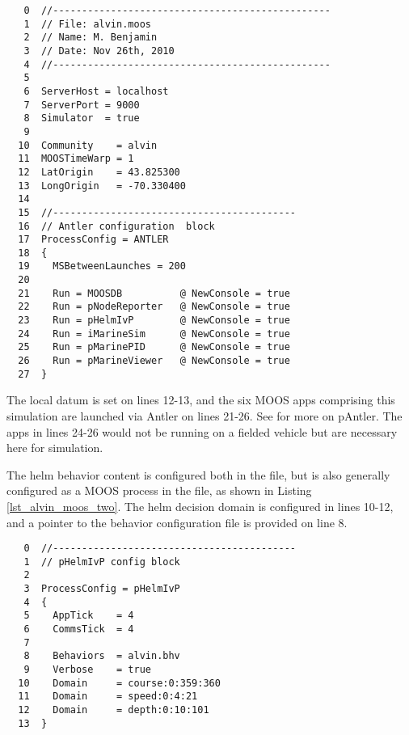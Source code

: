 \vspace{0.1in}
\vspace{0.1in}
\label{lst_alvin_moos_one}
\scriptsize
\begin{verbatim}
   0  //------------------------------------------------
   1  // File: alvin.moos
   2  // Name: M. Benjamin
   3  // Date: Nov 26th, 2010
   4  //------------------------------------------------
   5  
   6  ServerHost = localhost
   7  ServerPort = 9000
   8  Simulator  = true
   9  
  10  Community    = alvin
  11  MOOSTimeWarp = 1
  12  LatOrigin    = 43.825300 
  13  LongOrigin   = -70.330400 
  14  
  15  //------------------------------------------
  16  // Antler configuration  block
  17  ProcessConfig = ANTLER
  18  {
  19    MSBetweenLaunches = 200
  20  
  21    Run = MOOSDB          @ NewConsole = true
  22    Run = pNodeReporter   @ NewConsole = true
  23    Run = pHelmIvP        @ NewConsole = true
  24    Run = iMarineSim      @ NewConsole = true
  25    Run = pMarinePID      @ NewConsole = true
  26    Run = pMarineViewer   @ NewConsole = true
  27  }
\end{verbatim}
\normalsize

The local datum is set on lines 12-13, and the six MOOS apps 
comprising this simulation are launched via Antler on lines
21-26. See \cite{url_oxmoos} for more on pAntler. The apps in
lines 24-26 would not be running on a fielded vehicle but are
necessary here for simulation.

\pskip

The helm behavior content is configured both in the 
file, but is also generally configured as a MOOS process in the
 file, as shown in Listing \ref{lst_alvin_moos_two}.
The helm decision domain is configured in lines 10-12, and a pointer
to the behavior configuration file is provided on line 8.

\vspace{0.1in}
\vspace{0.1in}
\label{lst_alvin_moos_two}
\scriptsize
\begin{verbatim}
   0  //------------------------------------------
   1  // pHelmIvP config block
   2  
   3  ProcessConfig = pHelmIvP
   4  {
   5    AppTick    = 4
   6    CommsTick  = 4
   7  
   8    Behaviors  = alvin.bhv
   9    Verbose    = true
  10    Domain     = course:0:359:360
  11    Domain     = speed:0:4:21
  12    Domain     = depth:0:10:101
  13  }
\end{verbatim}
\normalsize

